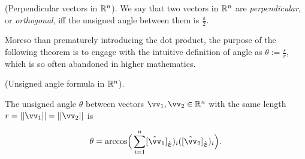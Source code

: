 \begin{defn}
    (Perpendicular vectors in $\mathbb{R}^n$). We say that two vectors in $\mathbb{R}^n$ are \textit{perpendicular}, or \textit{orthogonal}, iff the unsigned angle between them is $\frac{\pi}{2}$.
\end{defn}

Moreso than prematurely introducing the dot product, the purpose of the following theorem is to engage with the intuitive definition of angle as $\theta := \frac{s}{r}$, which is so often abandoned in higher mathematics.

\begin{theorem}
\label{ch::lin_alg::thm::unsigned_angle_Rn}
    (Unsigned angle formula in $\mathbb{R}^n$).
    
    The unsigned angle $\theta$ between vectors $\vv_1, \vv_2 \in \R^n$ with the same length $r = ||\vv_1|| = ||\vv_2||$ is
    
    \begin{align*}
        \theta = \text{arccos}\Big( \sum_{i = 1}^n [\hat{\vv}_1]_\sE)_i  ([\hat{\vv}_2]_\sE)_i \Big).
    \end{align*}
\end{theorem}

